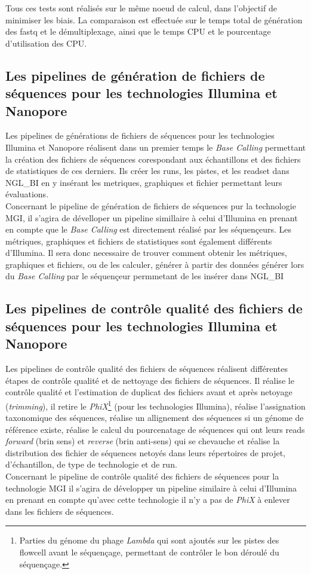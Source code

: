 Tous ces tests sont réalisés sur le même noeud de calcul, dans l'objectif de minimiser les biais. La comparaison est effectuée sur le temps total de génération des fastq et le démultiplexage, ainsi que le temps CPU et le pourcentage d'utilisation des CPU.

\subsection{Les pipelines de génération de fichiers de séquences pour les technologies Illumina et Nanopore}
Les pipelines de générations de fichiers de séquences pour les technologies Illumina et Nanopore réalisent dans un premier temps le \emph{Base Calling} permettant la création des fichiers de séquences corespondant aux échantillons et des fichiers de statistiques de ces derniers. Ils créer les runs, les pistes, et les readset dans NGL\_BI en y insérant les metriques, graphiques et fichier permettant leurs évaluations.\\

Concernant le pipeline de génération de fichiers de séquences pur la technologie MGI, il s'agira de dévelloper un pipeline simillaire à celui d'Illumina en prenant en compte que le \emph{Base Calling} est directement réalisé par les séquençeurs. Les métriques, graphiques et fichiers de statistiques sont également différents d'Illumina. Il sera donc necessaire de trouver comment obtenir les métriques, graphiques et fichiers, ou de les calculer, générer à partir des données générer lors du \emph{Base Calling} par le séquençeur permmetant de les insérer dans NGL\_BI

\subsection{Les pipelines de contrôle qualité des fichiers de séquences pour les technologies Illumina et Nanopore}
Les pipelines de contrôle qualité des fichiers de séquences réalisent différentes étapes de contrôle qualité et de nettoyage des fichiers de séquences. Il réalise le contrôle qualité et l'estimation de duplicat des fichiers avant et après netoyage (\emph{trimming}), il retire le \emph{PhiX}\footnote{Parties du génome du phage \emph{Lambda} qui sont ajoutés sur les pistes des flowcell avant le séquençage, permettant de contrôler le bon déroulé du séquençage.} (pour les technologies Illumina), réalise l'assignation taxonomique des séquences, réalise un allignement des séquences si un génome de référence existe, réalise le calcul du pourcenatage de séquences qui ont leurs reads \emph{forward} (brin sens) et \emph{reverse} (brin anti-sens) qui se chevauche et réalise la distribution des fichier de séquences netoyés dans leurs répertoires de projet, d'échantillon, de type de technologie et de run.\\

Concernant le pipeline de contrôle qualité des fichiers de séquences pour la technologie MGI il s'agira de développer un pipeline similaire à celui d'Illumina en prenant en compte qu'avec cette technologie il n'y a pas de \emph{PhiX} à enlever dans les fichiers de séquences.